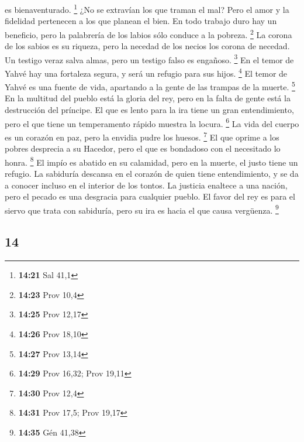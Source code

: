 \begin{paracol}{2}
es bienaventurado. \footnote{\textbf{14:21} Sal 41,1} 
¿No se extravían los que traman el mal? Pero el amor y la fidelidad
pertenecen a los que planean el bien.  En todo trabajo
duro hay un beneficio, pero la palabrería de los labios sólo conduce a
la pobreza. \footnote{\textbf{14:23} Prov 10,4}  La
corona de los sabios es su riqueza, pero la necedad de los necios los
corona de necedad.  Un testigo veraz salva almas, pero un
testigo falso es engañoso. \footnote{\textbf{14:25} Prov 12,17}
 En el temor de Yahvé hay una fortaleza segura, y será un
refugio para sus hijos. \footnote{\textbf{14:26} Prov 18,10}
 El temor de Yahvé es una fuente de vida, apartando a la
gente de las trampas de la muerte. \footnote{\textbf{14:27} Prov 13,14}
 En la multitud del pueblo está la gloria del rey, pero
en la falta de gente está la destrucción del príncipe. 
El que es lento para la ira tiene un gran entendimiento, pero el que
tiene un temperamento rápido muestra la locura. \footnote{\textbf{14:29}
  Prov 16,32; Prov 19,11}  La vida del cuerpo es un
corazón en paz, pero la envidia pudre los huesos. \footnote{\textbf{14:30}
  Prov 12,4}  El que oprime a los pobres desprecia a su
Hacedor, pero el que es bondadoso con el necesitado lo honra.
\footnote{\textbf{14:31} Prov 17,5; Prov 19,17}  El impío
es abatido en su calamidad, pero en la muerte, el justo tiene un
refugio.  La sabiduría descansa en el corazón de quien
tiene entendimiento, y se da a conocer incluso en el interior de los
tontos.  La justicia enaltece a una nación, pero el
pecado es una desgracia para cualquier pueblo.  El favor
del rey es para el siervo que trata con sabiduría, pero su ira es hacia
el que causa vergüenza. \footnote{\textbf{14:35} Gén 41,38}

\switchcolumn
\begin{otherlanguage}{english}

\hypertarget{section-27}{%
\section{14}\label{section-27}}


\end{otherlanguage}
\end{paracol}
